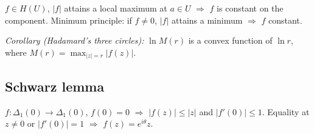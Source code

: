 $f\in H(U)$, $|f|$ attains a local maximum at $a\in U$ $\Rightarrow$ $f$ is constant on the component. Minimum principle: if $f\neq0$, $|f|$ attains a minimum $\Rightarrow$ $f$ constant.

\textit{Corollary (Hadamard's three circles):} $\ln M(r)$ is a convex function of $\ln r$, where $M(r)=\max_{|z|=r}|f(z)|$.

\subsection{Schwarz lemma}
\label{subsec:schwarz-lemma}

$f:\Delta_1(0)\to\Delta_1(0)$, $f(0)=0$ $\Rightarrow$ $|f(z)|\le|z|$ and $|f'(0)|\le1$. Equality at $z\neq0$ or $|f'(0)|=1$ $\Rightarrow$ $f(z)=e^{i\theta}z$.
